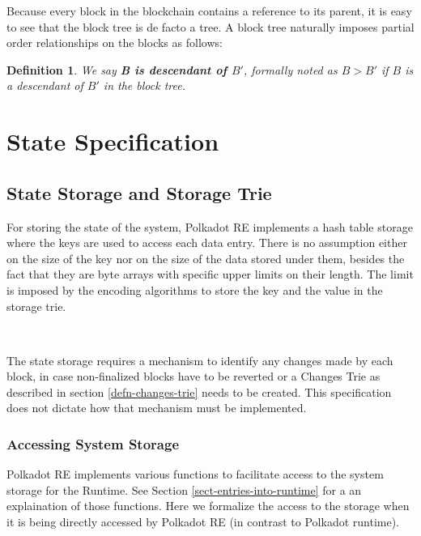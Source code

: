 \documentclass{book}
\newcommand{\tmstrong}[1]{\textbf{#1}}
\newcommand{\tmtextbf}[1]{{\bfseries{#1}}}
\newtheorem{definition}{Definition}
\providecommand{\tmstrong}[1]{\tmtextbf{#1}}
\providecommand{\tmtextbf}[1]{\tmtextbf{#1}}
\newtheorem{definition}{Definition}
\begin{document}
Because every block in the blockchain contains a reference to its parent, it
is easy to see that the block tree is de facto a tree. A block tree naturally
imposes partial order relationships on the blocks as follows:

\begin{definition}
  We say {\tmstrong{B is descendant of $B'$}}, formally noted as {\tmstrong{$B
  > B'$}} if $B$ is a descendant of $B'$ in the block tree.
\end{definition}

\chapter{State Specification}\label{chap-state-spec}

\section{State Storage and Storage Trie}\label{sect-state-storage}

For storing the state of the system, Polkadot RE implements a hash table
storage where the keys are used to access each data entry. There is no
assumption either on the size of the key nor on the size of the data stored
under them, besides the fact that they are byte arrays with specific upper
limits on their length. The limit is imposed by the encoding algorithms to
store the key and the value in the storage trie.

\

The state storage requires a mechanism to identify any changes made by each
block, in case non-finalized blocks have to be reverted or a Changes Trie as
described in section \ref{defn-changes-trie} needs to be created. This
specification does not dictate how that mechanism must be implemented.

\subsection{Accessing System Storage }

Polkadot RE implements various functions to facilitate access to the system
storage for the Runtime. See Section \ref{sect-entries-into-runtime} for a an
explaination of those functions. Here we formalize the access to the storage
when it is being directly accessed by Polkadot RE (in contrast to Polkadot
runtime).
\end{document}
